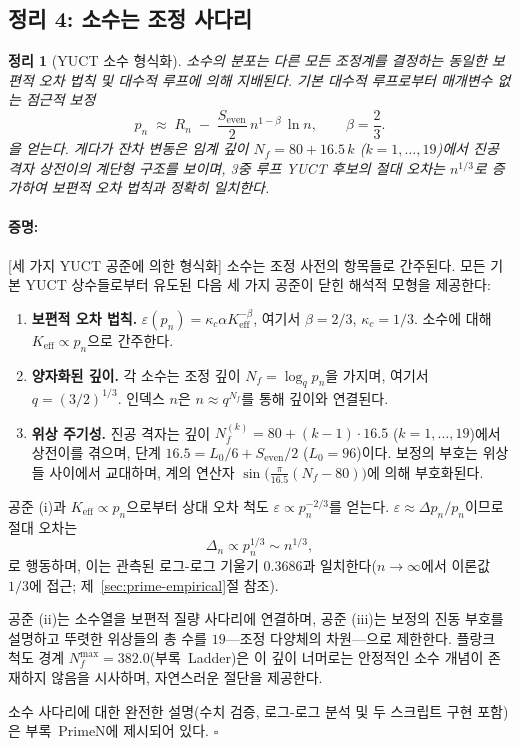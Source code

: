 \documentclass[12pt,a4paper]{article}
\newtheorem{theorem}{정리}[section]
\theoremstyle{remark}
\renewenvironment{proof}{\paragraph{증명:}}{\hfill$\square$}
\begin{document}
	\subsection{정리 4: 소수는 조정 사다리}
	
	\begin{theorem}[YUCT 소수 형식화]\label{thm:prime}
		소수의 분포는 다른 모든 조정계를 결정하는 동일한 보편적 오차 법칙 및 대수적 루프에 의해 지배된다. 기본 대수적 루프로부터 매개변수 없는 점근적 보정
		\begin{equation}\label{eq:yuct-prime-theorem}
			\boxed{ p_n \;\approx\; R_n \;-\; \frac{S_{\mathrm{even}}}{2}\,
				n^{1-\beta}\,\ln n },
			\qquad \beta = \frac{2}{3}.
		\end{equation}
		을 얻는다. 게다가 잔차 변동은 임계 깊이 \(N_f = 80 + 16.5\,k\) (\(k=1,\dots,19\))에서 진공 격자 상전이의 계단형 구조를 보이며, 3중 루프 YUCT 후보의 절대 오차는 \(n^{1/3}\)로 증가하여 보편적 오차 법칙과 정확히 일치한다.
	\end{theorem}
	
	\begin{proof}[세 가지 YUCT 공준에 의한 형식화]
		소수는 조정 사전의 항목들로 간주된다. 모든 기본 YUCT 상수들로부터 유도된 다음 세 가지 공준이 닫힌 해석적 모형을 제공한다:
		\begin{enumerate}[label=(\roman*)]
			\item \textbf{보편적 오차 법칙.} \(\varepsilon(p_n) = \kappa_c \alpha K_{\mathrm{eff}}^{-\beta}\), 여기서 \(\beta = 2/3\), \(\kappa_c = 1/3\). 소수에 대해 \(K_{\mathrm{eff}} \propto p_n\)으로 간주한다.
			\item \textbf{양자화된 깊이.} 각 소수는 조정 깊이 \(N_f = \log_q p_n\)을 가지며, 여기서 \(q = (3/2)^{1/3}\). 인덱스 \(n\)은 \(n \approx q^{N_f}\)를 통해 깊이와 연결된다.
			\item \textbf{위상 주기성.} 진공 격자는 깊이 \(N_f^{(k)} = 80 + (k-1)\cdot 16.5\) (\(k=1,\dots,19\))에서 상전이를 겪으며, 단계 \(16.5 = L_0/6 + S_{\mathrm{even}}/2\) (\(L_0=96\))이다. 보정의 부호는 위상들 사이에서 교대하며, 계의 연산자 \(\sin\bigl(\frac{\pi}{16.5}(N_f-80)\bigr)\)에 의해 부호화된다.
		\end{enumerate}
		
		공준 (i)과 \(K_{\mathrm{eff}} \propto p_n\)으로부터 상대 오차 척도 \(\varepsilon \propto p_n^{-2/3}\)를 얻는다. \(\varepsilon \approx \Delta p_n / p_n\)이므로 절대 오차는
		\[
		\Delta_n \propto p_n^{1/3} \sim n^{1/3},
		\]
		로 행동하며, 이는 관측된 로그-로그 기울기 \(0.3686\)과 일치한다(\(n\to\infty\)에서 이론값 \(1/3\)에 접근; 제~\ref{sec:prime-empirical}절 참조).
		
		공준 (ii)는 소수열을 보편적 질량 사다리에 연결하며, 공준 (iii)는 보정의 진동 부호를 설명하고 뚜렷한 위상들의 총 수를 \(19\)—조정 다양체의 차원—으로 제한한다. 플랑크 척도 경계 \(N_f^{\max} = 382.0\)(부록~Ladder)은 이 깊이 너머로는 안정적인 소수 개념이 존재하지 않음을 시사하며, 자연스러운 절단을 제공한다.
		
		소수 사다리에 대한 완전한 설명(수치 검증, 로그-로그 분석 및 두 스크립트 구현 포함)은 부록~PrimeN에 제시되어 있다.
	\end{proof}
	
\end{document}
